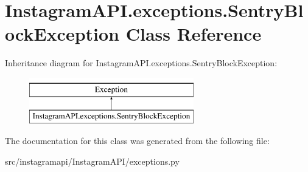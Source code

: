 \hypertarget{class_instagram_a_p_i_1_1exceptions_1_1_sentry_block_exception}{}\section{Instagram\+A\+P\+I.\+exceptions.\+Sentry\+Block\+Exception Class Reference}
\label{class_instagram_a_p_i_1_1exceptions_1_1_sentry_block_exception}
Inheritance diagram for Instagram\+A\+P\+I.\+exceptions.\+Sentry\+Block\+Exception\+:\begin{figure}[H]
\begin{center}
\leavevmode
\includegraphics[height=2.000000cm]{class_instagram_a_p_i_1_1exceptions_1_1_sentry_block_exception}
\end{center}
\end{figure}


The documentation for this class was generated from the following file\+:\begin{DoxyCompactItemize}
\item 
src/instagramapi/\+Instagram\+A\+P\+I/exceptions.\+py\end{DoxyCompactItemize}
